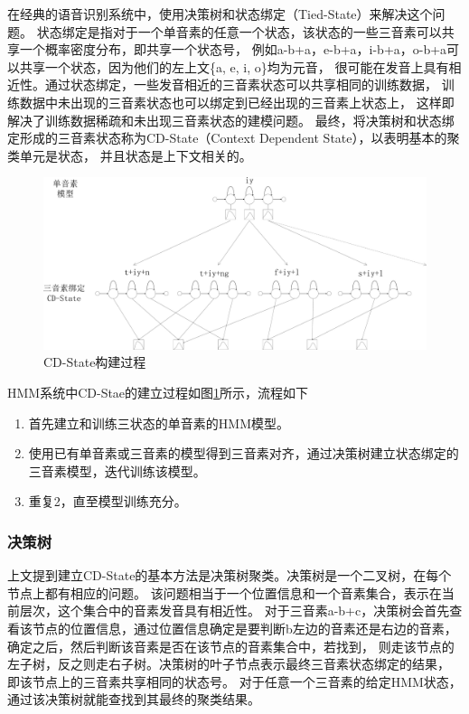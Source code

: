 在经典的语音识别系统中，使用决策树和状态绑定（Tied-State）来解决这个问题。
状态绑定是指对于一个单音素的任意一个状态，该状态的一些三音素可以共享一个概率密度分布，即共享一个状态号，
例如a-b+a，e-b+a，i-b+a，o-b+a可以共享一个状态，因为他们的左上文\{a, e, i, o\}均为元音，
很可能在发音上具有相近性。通过状态绑定，一些发音相近的三音素状态可以共享相同的训练数据，
训练数据中未出现的三音素状态也可以绑定到已经出现的三音素上状态上，
这样即解决了训练数据稀疏和未出现三音素状态的建模问题。
最终，将决策树和状态绑定形成的三音素状态称为CD-State（Context Dependent State），以表明基本的聚类单元是状态，
并且状态是上下文相关的。

\begin{figure}[htbp]
\centering
\includegraphics[width=1.0\textwidth]{figures/chapter4/cdstate-crop}
\caption{CD-State构建过程}
\label{fig:cdstate}
\end{figure}

HMM系统中CD-Stae的建立过程如图\ref{fig:cdstate}所示，流程如下
    \begin{enumerate}
        \item 首先建立和训练三状态的单音素的HMM模型。
        \item 使用已有单音素或三音素的模型得到三音素对齐，通过决策树建立状态绑定的三音素模型，迭代训练该模型。
        \item 重复2，直至模型训练充分。
    \end{enumerate}

\subsubsection{决策树}

上文提到建立CD-State的基本方法是决策树聚类。决策树是一个二叉树，在每个节点上都有相应的问题。
该问题相当于一个位置信息和一个音素集合，表示在当前层次，这个集合中的音素发音具有相近性。
对于三音素a-b+c，决策树会首先查看该节点的位置信息，通过位置信息确定是要判断b左边的音素还是右边的音素，
确定之后，然后判断该音素是否在该节点的音素集合中，若找到，
则走该节点的左子树，反之则走右子树。决策树的叶子节点表示最终三音素状态绑定的结果，
即该节点上的三音素共享相同的状态号。
对于任意一个三音素的给定HMM状态，通过该决策树就能查找到其最终的聚类结果。

